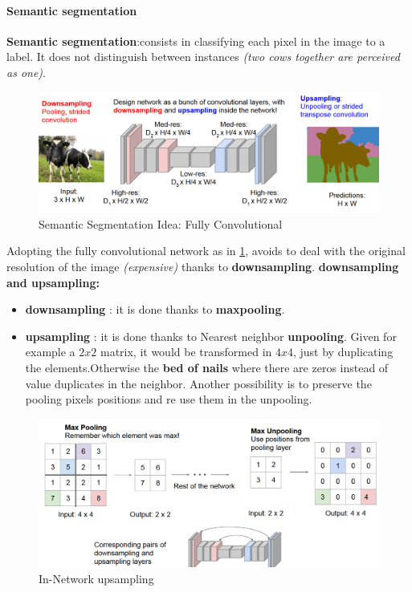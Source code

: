 \documentclass[11pt]{article}
\begin{document}
\paragraph{Semantic segmentation}
\textbf{Semantic segmentation}:consists in classifying each pixel in the image to a label.
It does not distinguish between instances \textit{(two cows together are perceived as one)}. 
\begin{figure}[h]
\centering
\captionsetup{justification=centering}
\includegraphics[width=1\linewidth]{L1011.pdf}
\caption{ Semantic Segmentation Idea: Fully Convolutional}
\label{fig:L1011}
\end{figure}
Adopting the fully convolutional network as in \ref{fig:L1011}, avoids to deal with the original resolution of the image \textit{(expensive)} thanks to \textbf{downsampling}.
\textbf{downsampling and upsampling:}
\begin{itemize}
    \item \textbf{downsampling} : it is done thanks to \textbf{maxpooling}.
    \item \textbf{upsampling} : it is done thanks to Nearest neighbor \textbf{unpooling}. Given for example a $2x2$ matrix, it would be transformed in $4x4$, just by duplicating the elements.Otherwise the \textbf{bed of nails} where there are zeros instead of value duplicates in the neighbor. Another possibility is to preserve the pooling pixels positions and re use them in the unpooling.
\end{itemize}{}
\begin{figure}[h]
\centering
\captionsetup{justification=centering}
\includegraphics[width=1\linewidth]{L1012.pdf}
\caption{ In-Network upsampling}
\label{fig:L1012}
\end{figure}
\end{document}
